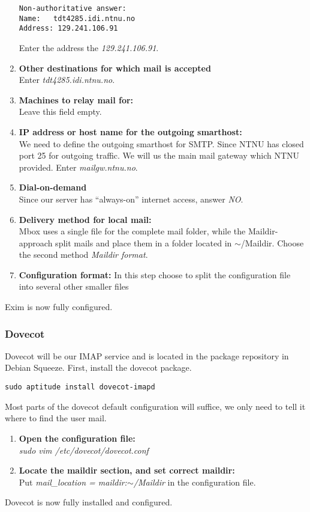 \begin{enumerate}
\begin{lstlisting}
Non-authoritative answer:
Name:	tdt4285.idi.ntnu.no
Address: 129.241.106.91
\end{lstlisting}
Enter the address the \emph{129.241.106.91}.
\item\textbf{Other destinations for which mail is accepted}\\
Enter \emph{tdt4285.idi.ntnu.no}.
\item\textbf{Machines to relay mail for:}\\
Leave this field empty.
\item\textbf{IP address or host name for the outgoing smarthost:}\\
We need to define the outgoing smarthost for SMTP. Since NTNU has closed
port 25 for outgoing traffic. We will us the main mail gateway which
NTNU provided. Enter \emph{mailgw.ntnu.no}.
\item\textbf{Dial-on-demand}\\
Since our server has ``always-on'' internet access, answer \emph{NO}.
\item\textbf{Delivery method for local mail:}\\
Mbox uses a single file for the complete mail folder, while the
Maildir-approach split mails and place them in a folder located in
$\sim$/Maildir. Choose the second method \emph{Maildir format}.
\item\textbf{Configuration format:}
In this step choose to split the configuration file into several other
smaller files
\end{enumerate}
Exim is now fully configured.

\subsubsection{Dovecot}
Dovecot will be our IMAP service and is located in the package
repository in Debian Squeeze. First, install the dovecot package.
\begin{lstlisting}
sudo aptitude install dovecot-imapd
\end{lstlisting}
Most parts of the dovecot default configuration will suffice, we only
need to tell it where to find the user mail.
\begin{enumerate}
	\item\textbf{Open the configuration file:}\\
 	\emph{sudo vim /etc/dovecot/dovecot.conf}
	\item\textbf{Locate the maildir section, and set correct maildir:}\\
	Put \emph{mail\_location = maildir:$\sim$/Maildir} in the
	configuration file.
\end{enumerate}
Dovecot is now fully installed and configured.
